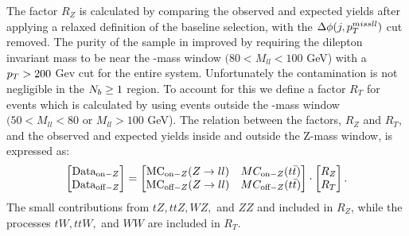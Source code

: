 The factor $R_Z$ is calculated by comparing the observed and expected \Zll{} yields after applying a relaxed definition of the baseline selection, with the $\Delta\phi(j,p_{T}^{miss ll})$ cut removed. The purity of the sample in improved by requiring the dilepton invariant mass to be near the \Z-mass window $(80<M_{ll}<100$ GeV) with a $p_{T}>200$ Gev cut for the entire system. Unfortunately the \ttbar{} contamination is not negligible in the $N_{b}\geq1$ region. To account for this we define a factor $R_T$ for \ttbar{} events which is calculated by using events outside the \Z-mass window $(50<M_{ll}<80$ or $M_{ll}>100$ GeV). The relation between the factors, $R_Z$ and $R_T$, and the observed and expected yields inside and outside the Z-mass window, is expressed as:
\begin{equation}
\begin{bmatrix}
\text{Data}_{\text{on}-Z} \\
\text{Data}_{\text{off}-Z}
\end{bmatrix}
=
\begin{bmatrix}
\text{MC}_{\text{on}-Z}(Z\rightarrow ll) & MC_{\text{on}-Z}(t\bar{t}) \\
\text{MC}_{\text{off}-Z}(Z\rightarrow ll) & MC_{\text{off}-Z}(t\bar{t})
\end{bmatrix}
\cdot
\begin{bmatrix}
R_Z \\
R_T
\end{bmatrix}.
\end{equation}
The small contributions from $tZ, ttZ, WZ,$ and $ZZ$ and included in $R_Z$, while the processes $tW, ttW,$ and $WW$ are included in $R_T$. 



